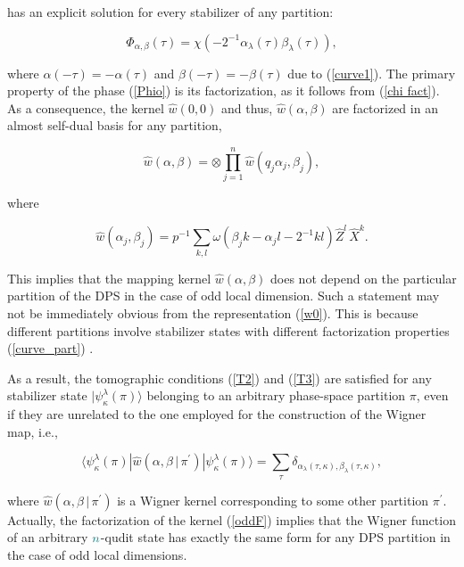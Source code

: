 \documentclass[quantumrep,article,submit,pdftex,moreauthors]{Definitions/mdpi}
\begin{document}
has an explicit solution for every stabilizer of any partition:

\begin{equation}
  \Phi_{\alpha ,\beta }(\tau)
  = \chi\left( -2^{-1}\alpha _{\lambda }(\tau)\beta_{\lambda}(\tau)\right),
  \label{Phio}
\end{equation}

where $\alpha (-\tau )=-\alpha (\tau )$ and $\beta (-\tau )=-\beta (\tau )$ due
to (\ref{curve1}). The primary property of the phase (\ref{Phio}) is its
factorization, as it follows from (\ref{chi fact}). As a consequence, the
kernel $\hat{w}\left( 0,0\right)$ and thus, $\hat{w}\left(\alpha ,\beta\right)$
are factorized in an almost self-dual basis for any partition,

\begin{equation}
  \hat{w}\left( \alpha ,\beta \right)
  = \otimes \prod\limits_{j=1}^{n}\hat{w}\left(
    q_{j}\alpha_{j},\beta_{j}
  \right),
  \label{oddF}
\end{equation}

where

\begin{equation*}
  \hat{w}(\alpha_{j},\beta_{j})
  = p^{-1} \sum_{k,l} \omega(\beta_{j} k - \alpha_{j} l - 2^{-1} k l)
  \hat{Z}^{l} \,\hat{X}^{k}.
\end{equation*}

This implies that the mapping kernel $\hat{w}\left( \alpha ,\beta \right)$ does
not depend on the particular partition of the DPS {\color{teal}in the case of
odd local dimension}. Such a statement may not be immediately obvious from the
representation (\ref{w0}). This is because different partitions involve
stabilizer states with different factorization properties (\ref{curve_part})
\cite{Bjork2007}.

As a result, the tomographic conditions (\ref{T2}) and (\ref{T3}) are satisfied
for any stabilizer state $|\psi_{\kappa }^{\lambda }(\pi )\rangle $ belonging to
an arbitrary phase-space partition $\pi $, even if they are unrelated to the one
employed for the construction of the Wigner map, i.e.,

\begin{equation*}
  \langle \psi_{\kappa}^{\lambda}(\pi) |\hat{w} \left(
    \alpha,\beta \, | \, \pi^{\prime}
  \right) |\psi_{\kappa}^{\lambda}(\pi)\rangle
  = \sum_{\tau} \delta_{\alpha_{\lambda}(\tau,\kappa),\beta_{\lambda}(\tau,\kappa)},
\end{equation*}

where $\hat{w}\left( \alpha ,\beta \,|\,\pi ^{\prime }\right) $ is a Wigner
kernel corresponding to some other partition $\pi ^{\prime }$.
{\color{teal}Actually, the factorization of the kernel (\ref{oddF}) implies that
  the Wigner function of an arbitrary $\color{teal}n$-qudit state has exactly
  the same form for any DPS partition in the case of odd local dimensions.}
\end{document}

